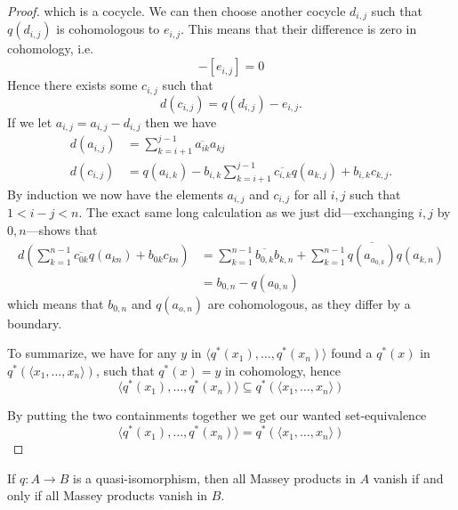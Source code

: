 \begin{proof}
which is a cocycle. We can then choose another cocycle $d_{i,j}$ such that $q(d_{i,j})$ is cohomologous to $e_{i,j}$. This means that their difference is zero in cohomology, i.e. 
\begin{equation*}
    [q(d_{i,j})]-[e_{i,j}] = 0
\end{equation*}
Hence there exists some $c_{i,j}$ such that 
\begin{equation*}
    d(c_{i,j}) = q(d_{i,j}) - e_{i,j}.
\end{equation*}
If we let $a_{i,j} = a_{i,j}-d_{i,j}$ then we have 
\begin{align*}
    d(a_{i,j}) &= \sum_{k=i+1}^{j-1}\overline{a_{ik}}a_{kj} 
    \\
    d(c_{i,j}) &= q(a_{i,k}) - b_{i,k} \sum_{k=i+1}^{j-1}\overline{c_{i,k}}q(a_{k,j}) + b_{i,k}c_{k,j}.
\end{align*}
By induction we now have the elements $a_{i,j}$ and $c_{i,j}$ for all $i,j$ such that $1<i-j<n$. The exact same long calculation as we just did---exchanging $i,j$ by $0,n$---shows that 
\begin{align*}
    d\left(\sum_{k=1}^{n-1}\overline{c_{0k}}q(a_{kn})+b_{0k}c_{kn}\right)
    &=
    \sum_{k=1}^{n-1}\overline{b_{0,k}}b_{k,n} + \sum_{k=1}^{n-1}\overline{q(a_{a_{0,k}})}q(a_{k,n}) \\
    &= b_{0,n} - q(a_{0,n})
\end{align*}
which means that $b_{0,n}$ and $q(a_{o,n})$ are cohomologous, as they differ by a boundary. 

To summarize, we have for any $y$ in $ \langle q^*(x_1), \ldots, q^*(x_n)\rangle$ found a $q^*(x)$ in $q^*(\langle x_1, \ldots, x_n\rangle)$, such that $q^*(x)=y$ in cohomology, hence
\begin{equation*}
    \langle q^*(x_1), \ldots, q^*(x_n)\rangle \subseteq q^*(\langle x_1, \ldots, x_n\rangle)
\end{equation*}

By putting the two containments together we get our wanted set-equivalence 
\begin{equation*}
    \langle q^*(x_1), \ldots, q^*(x_n)\rangle = q^*(\langle x_1, \ldots, x_n\rangle)
\end{equation*}
\end{proof}


\begin{corollary}
\label{cor:quasi_preserves_massey}
If $q\colon A\longrightarrow B$ is a quasi-isomorphism, then all Massey products in $A$ vanish if and only if all Massey products vanish in $B$. 
\end{corollary}


